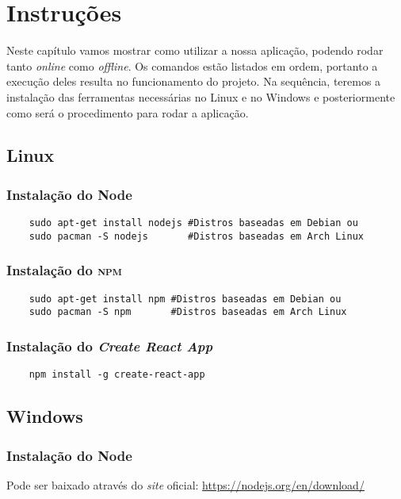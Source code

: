 \chapter{Instruções}
Neste capítulo vamos mostrar como utilizar a nossa aplicação, podendo rodar
tanto \emph{online} como \emph{offline}. Os comandos estão listados em ordem,
portanto a execução deles resulta no funcionamento do projeto. Na sequência,
teremos a instalação das ferramentas necessárias no Linux e no Windows e
posteriormente como será o procedimento para rodar a aplicação.

\section{Linux}
\subsection{Instalação do Node}
\begin{verbatim}
	sudo apt-get install nodejs #Distros baseadas em Debian ou
	sudo pacman -S nodejs       #Distros baseadas em Arch Linux
\end{verbatim}

\subsection{Instalação do \textsc{npm}}
\begin{verbatim}
	sudo apt-get install npm #Distros baseadas em Debian ou
	sudo pacman -S npm       #Distros baseadas em Arch Linux
\end{verbatim}

\subsection{Instalação do \emph{Create React App}}
\begin{verbatim}
	npm install -g create-react-app
\end{verbatim}

\section{Windows}
\subsection{Instalação do Node}
Pode ser baixado através do \emph{site} oficial:
\href{https://nodejs.org/en/download/}{https://nodejs.org/en/download/}

